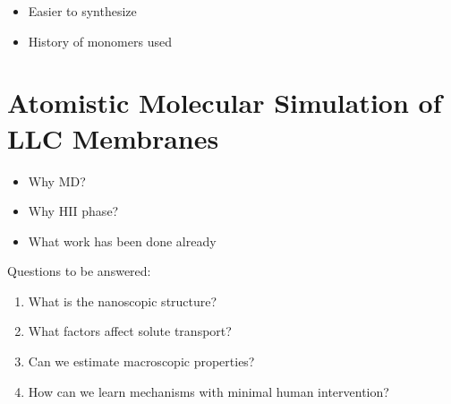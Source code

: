   \begin{itemize}
    \item Easier to synthesize
    \item History of monomers used
  \end{itemize}
  
  \section{Atomistic Molecular Simulation of LLC Membranes}
  
  \begin{itemize}
    \item Why MD?
    \item Why HII phase?
    \item What work has been done already
  \end{itemize}

  Questions to be answered: %
  \begin{enumerate}
    \item What is the nanoscopic structure?  %
    \item What factors affect solute transport?  %
    \item Can we estimate macroscopic properties?
    \item How can we learn mechanisms with minimal human intervention?  %
  \end{enumerate} 
